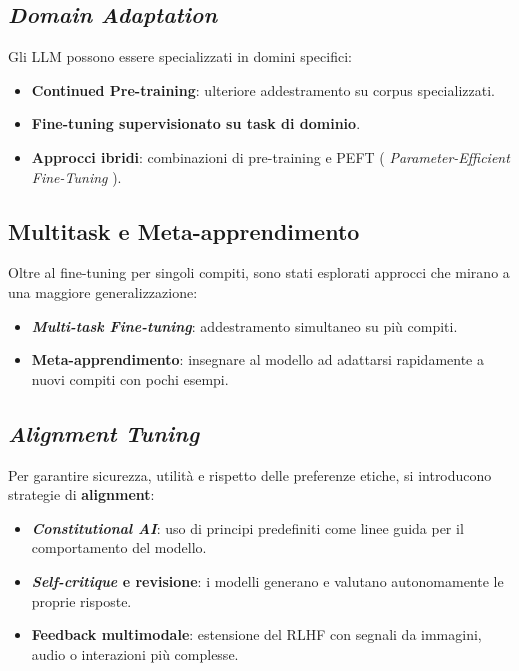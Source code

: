 \subsection{\textit{Domain Adaptation}}
Gli LLM possono essere specializzati in domini specifici:
\begin{itemize}
    \item \textbf{Continued Pre-training}: ulteriore addestramento su corpus specializzati.
    \item \textbf{Fine-tuning supervisionato su task di dominio}.
    \item \textbf{Approcci ibridi}: combinazioni di pre-training e PEFT ( \textit{Parameter-Efficient Fine-Tuning} ).
\end{itemize}

\subsection{Multitask e Meta-apprendimento}
Oltre al fine-tuning per singoli compiti, sono stati esplorati approcci che 
mirano a una maggiore generalizzazione:
\begin{itemize}
    \item \textbf{\textit{Multi-task Fine-tuning}}: addestramento simultaneo su più compiti.
    \item \textbf{Meta-apprendimento}: insegnare al modello ad adattarsi rapidamente a nuovi compiti con pochi esempi.
\end{itemize}

\subsection{\textit{Alignment Tuning}}
Per garantire sicurezza, utilità e rispetto delle preferenze etiche, 
si introducono strategie di \textbf{alignment}:
\begin{itemize}
    \item \textbf{\textit{Constitutional AI}}: uso di principi predefiniti come linee guida per il comportamento del modello.
    \item \textbf{\textit{Self-critique} e revisione}: i modelli generano e valutano autonomamente le proprie risposte.
    \item \textbf{Feedback multimodale}: estensione del RLHF con segnali da immagini, audio o interazioni più complesse.
\end{itemize}
\cite{touvron2023llama2}\cite{ouyang2022rlhf}


